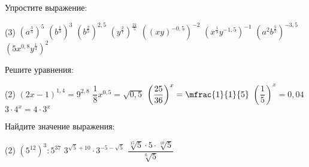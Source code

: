 \begin{homework}[number=2]
	\begin{listofex}
		\item Упростите выражение:
		\begin{tasks}(3)
			\task \( \left(a^{ \tfrac{3}{5}} \right)^5 \)
			\task \( \left(b^{\tfrac{1}{3}} \right)^3 \)
			\task \( \left(b^{\tfrac{2}{5}}\right)^{2,5} \)
			\task \( \left(y^{ \tfrac{2}{7}}\right)^{\tfrac{21}{5}} \)
			\task \( ((xy)^{-0,5})^{-2} \)
			\task \( \left(x^{ \tfrac{1}{3}}y^{-1,5}\right)^{-1} \)
			\task \( \left(a^{2}b^{\tfrac{5}{7}}\right)^{-3,5} \)
			\task \( \left(5x^{0,8}y^{\tfrac{1}{4}}\right)^{2} \)
		\end{tasks}
		\item Решите уравнения:
		\begin{tasks}(2)
			\task \( (2x-1)^{1,4}=9^{2,8} \)
			\task \( \dfrac{1}{8}x^{0,5} = \sqrt{0,5} \)
			\task \( \left( \dfrac{25}{36} \right)^x=\mfrac{1}{1}{5} \)
			\task \( \left( \dfrac{1}{5} \right)^x=0,04 \)
			\task \( 3 \cdot 4^x = 4 \cdot 3^x \)
		\end{tasks}
		\item Найдите значение выражения:
		\begin{tasks}(2)
			\task \( (5^{12})^3 : 5^{37} \)
			\task \( 3^{\sqrt{5}+10}\cdot3^{-5-\sqrt{5}} \)
			\task \( \dfrac{\sqrt[15]{5}\cdot5\cdot\sqrt[10]{5}}{\sqrt[6]{5}} \)
		\end{tasks}
	\end{listofex}
\end{homework}

